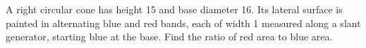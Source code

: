 A right circular cone has height 15 and base diameter 16. Its lateral surface is painted in alternating blue and red bands, each of width 1 measured along a slant generator, starting blue at the base. Find the ratio of red area to blue area.
